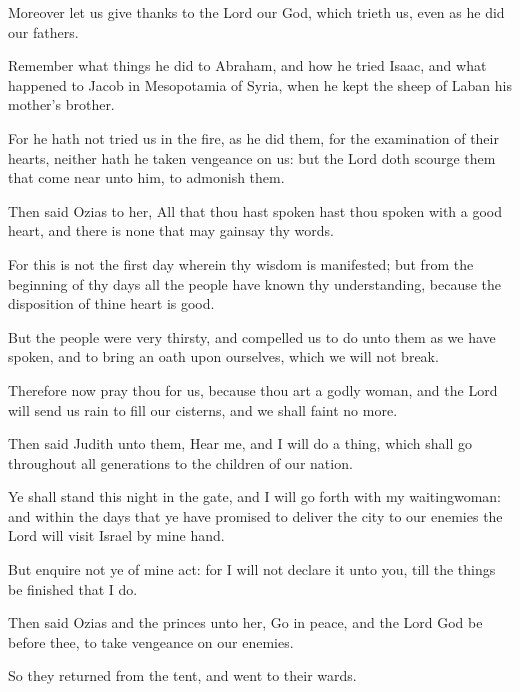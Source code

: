 {\par }{\PP {}Moreover let us give thanks to the Lord our God, which trieth us, even as he did our fathers.
\par }{\PP {}Remember what things he did to Abraham, and how he tried Isaac, and what happened to Jacob in Mesopotamia of Syria, when he kept the sheep of Laban his mother’s brother.
\par }{\PP {}For he hath not tried us in the fire, as he did them, for the examination of their hearts, neither hath he taken vengeance on us: but the Lord doth scourge them that come near unto him, to admonish them.
\par }{\PP {}Then said Ozias to her, All that thou hast spoken hast thou spoken with a good heart, and there is none that may gainsay thy words.
\par }{\PP {}For this is not the first day wherein thy wisdom is manifested; but from the beginning of thy days all the people have known thy understanding, because the disposition of thine heart is good.
\par }{\PP {}But the people were very thirsty, and compelled us to do unto them as we have spoken, and to bring an oath upon ourselves, which we will not break.
\par }{\PP {}Therefore now pray thou for us, because thou art a godly woman, and the Lord will send us rain to fill our cisterns, and we shall faint no more.
\par }{\PP {}Then said Judith unto them, Hear me, and I will do a thing, which shall go throughout all generations to the children of our nation.
\par }{\PP {}Ye shall stand this night in the gate, and I will go forth with my waitingwoman: and within the days that ye have promised to deliver the city to our enemies the Lord will visit Israel by mine hand.
\par }{\PP {}But enquire not ye of mine act: for I will not declare it unto you, till the things be finished that I do.
\par }{\PP {}Then said Ozias and the princes unto her, Go in peace, and the Lord God be before thee, to take vengeance on our enemies.
\par }{\PP {}So they returned from the tent, and went to their wards.

}
